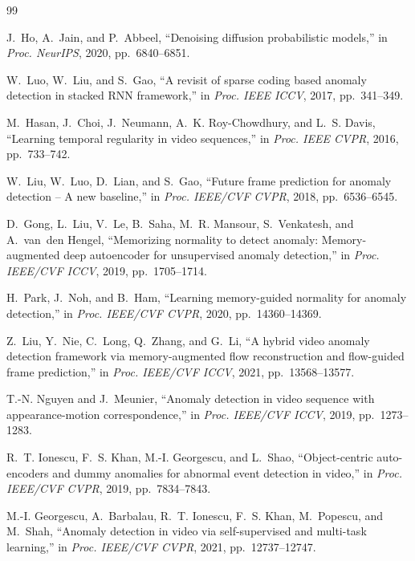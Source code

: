 \documentclass[11pt,a4paper]{article}
\begin{document}
\begin{thebibliography}{99}
\small

J.~Ho, A.~Jain, and P.~Abbeel, ``Denoising diffusion probabilistic models,'' in \emph{Proc. NeurIPS}, 2020, pp.~6840--6851.

W.~Luo, W.~Liu, and S.~Gao, ``A revisit of sparse coding based anomaly detection in stacked RNN framework,'' in \emph{Proc. IEEE ICCV}, 2017, pp.~341--349.

M.~Hasan, J.~Choi, J.~Neumann, A.~K. Roy-Chowdhury, and L.~S. Davis, ``Learning temporal regularity in video sequences,'' in \emph{Proc. IEEE CVPR}, 2016, pp.~733--742.

W.~Liu, W.~Luo, D.~Lian, and S.~Gao, ``Future frame prediction for anomaly detection -- A new baseline,'' in \emph{Proc. IEEE/CVF CVPR}, 2018, pp.~6536--6545.

D.~Gong, L.~Liu, V.~Le, B.~Saha, M.~R. Mansour, S.~Venkatesh, and A.~van~den Hengel, ``Memorizing normality to detect anomaly: Memory-augmented deep autoencoder for unsupervised anomaly detection,'' in \emph{Proc. IEEE/CVF ICCV}, 2019, pp.~1705--1714.

H.~Park, J.~Noh, and B.~Ham, ``Learning memory-guided normality for anomaly detection,'' in \emph{Proc. IEEE/CVF CVPR}, 2020, pp.~14360--14369.

Z.~Liu, Y.~Nie, C.~Long, Q.~Zhang, and G.~Li, ``A hybrid video anomaly detection framework via memory-augmented flow reconstruction and flow-guided frame prediction,'' in \emph{Proc. IEEE/CVF ICCV}, 2021, pp.~13568--13577.

T.-N. Nguyen and J.~Meunier, ``Anomaly detection in video sequence with appearance-motion correspondence,'' in \emph{Proc. IEEE/CVF ICCV}, 2019, pp.~1273--1283.

R.~T. Ionescu, F.~S. Khan, M.-I. Georgescu, and L.~Shao, ``Object-centric auto-encoders and dummy anomalies for abnormal event detection in video,'' in \emph{Proc. IEEE/CVF CVPR}, 2019, pp.~7834--7843.

M.-I. Georgescu, A.~Barbalau, R.~T. Ionescu, F.~S. Khan, M.~Popescu, and M.~Shah, ``Anomaly detection in video via self-supervised and multi-task learning,'' in \emph{Proc. IEEE/CVF CVPR}, 2021, pp.~12737--12747.


\end{thebibliography}
\end{document}
